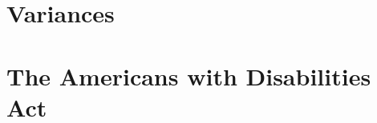 

\begin{questions}

\end{questions}


\section{Variances}






                                                              
\begin{questions}                                             
                                    
\end{questions}                                               



\section{The Americans with Disabilities Act}                 
                                                              
                            
                                                              
                           
                                                              
\begin{questions}                                             
                        
\end{questions}                                               


